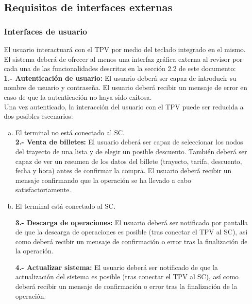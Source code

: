 \subsection{Requisitos de interfaces externas}

\subsubsection{Interfaces de usuario}

\color{red} El usuario interactuará con el TPV por medio del teclado integrado en el mismo. \color{black} El sistema deberá de ofrecer al menos una interfaz gráfica externa al revisor por cada una de las funcionalidades descritas en la sección 2.2 de este documento:\\

\textbf{1.- Autenticación de usuario:} El usuario deberá ser capaz de introducir su nombre de usuario y contraseña. El usuario deberá recibir un mensaje de error en caso de que la autenticación no haya sido exitosa.\\

Una vez autenticado, la interacción del usuario con el TPV puede ser reducida a dos posibles escenarios:

\begin{enumerate}[(a)]
\item El terminal no está conectado al SC.\\

\textbf{2.- Venta de billetes:} El usuario deberá ser capaz de seleccionar los nodos del trayecto de una lista y de elegir un posible descuento. También deberá ser capaz de ver un resumen de los datos del billete (trayecto, tarifa, descuento, fecha y hora) antes de confirmar la compra. El usuario deberá recibir un mensaje confirmando que la operación se ha llevado a cabo satisfactoriamente.

\item El terminal está conectado al SC.

\textbf{3.- Descarga de operaciones:} El usuario deberá ser notificado por pantalla de que la descarga de operaciones es posible (tras conectar el TPV al SC), así como deberá recibir un mensaje de confirmación o error tras la finalización de la operación.

\textbf{4.- Actualizar sistema:} El usuario deberá ser notificado de que la actualización del sistema es posible (tras conectar el TPV al SC), así como deberá recibir un mensaje de confirmación o error tras la finalización de la operación.

\end{enumerate}

